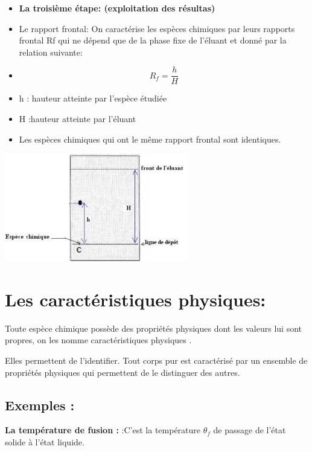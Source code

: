 \documentclass[12pt]{article}
\begin{document}
\begin{itemize}

\item \textbf{La troisième étape: (exploitation des résultas)}

\item Le rapport frontal: On caractérise les espèces chimiques par leurs rapports frontal Rf qui ne dépend que de la phase fixe de l'éluant et donné par la relation suivante:
	
\item $$R_f = \frac{h}{H}$$
\item h : hauteur atteinte par l’espèce étudiée
\item H :hauteur atteinte par
l’éluant

\item Les espèces chimiques qui ont le même rapport frontal sont identiques.

\end{itemize}
\begin{center}
	\includegraphics[width=0.6\textwidth]{./img/Extraction_07.png}
\end{center}



\section{Les caractéristiques physiques:}
Toute espèce chimique possède des propriétés physiques dont les valeurs lui sont propres, on les nomme
caractéristiques physiques .

Elles permettent de l'identifier.
Tout corps pur est caractérisé par un ensemble de propriétés physiques qui permettent de le distinguer des autres.

\subsection{Exemples : }
\textbf{La température de fusion : }:C'est la température $\theta_f$ de passage de l'état solide à l'état liquide. 
\end{document}
